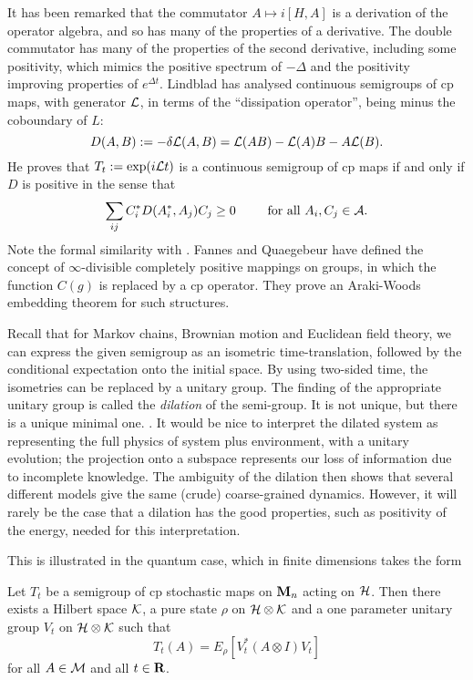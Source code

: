 It has been remarked that the commutator $A\mapsto i[H,A]$ is a derivation
of the operator algebra, and so has many of the properties of a derivative.
The double commutator
has many of the properties of the second derivative, including some
positivity, which mimics the positive spectrum of $-\Delta$ and the
positivity improving properties of $e^{\Delta t}$.
Lindblad has analysed continuous semigroups of cp maps, with generator ${\cal
L}$, in terms of the ``dissipation operator'', being minus the coboundary of
$L$:
\begin{equation}
D(A,B):=-\delta{\cal L}(A,B)={\cal L}(AB)-{\cal L}(A)B-A{\cal L}(B).
\end{equation}
He proves that $T_t:=\exp(i{\cal L}t)$ is a continuous semigroup of cp maps
if and only if $D$ is positive in the sense that
\begin{equation}
\sum_{ij}C_i^*D(A_i^*,A_j)C_j\geq0\hspace{.3in}\mbox{ for all }A_i, C_j\in
{\cal A}.
\end{equation}
Note the formal similarity with \cite{Araki,RFS2,RFS4,Partha}. Fannes and
Quaegebeur \cite{Fannes} have defined the concept of $\infty$-divisible
completely positive mappings on groups, in which the function $C(g)$ is
replaced by a cp operator. They prove an Araki-Woods embedding theorem
for such structures.


Recall that for Markov chains, Brownian motion and Euclidean field theory,
we can express the given semigroup as an isometric time-translation,
followed by the conditional expectation onto the initial space.
By using two-sided time, the isometries can be replaced by a unitary group.
The finding of the appropriate unitary group is called the {\em dilation}
of the semi-group. It is not unique, but there is a unique minimal one.
\cite{Stinespring}. It would be nice to interpret the dilated system
as representing the full physics of system plus environment, with a
unitary evolution; the projection onto a subspace represents our loss
of information due to incomplete knowledge. The ambiguity of the dilation
then shows that several different models give the same (crude)
coarse-grained dynamics. However, it will rarely be the case that a dilation
has the good properties, such as positivity of the energy, needed for
this interpretation.

This is illustrated in the quantum case, which in finite dimensions
takes the form \cite{Davies}
\begin{theorem}
Let $T_t$ be a semigroup of cp stochastic maps on ${\bf M}_n$ acting
on ${\cal H}$. Then there exists a Hilbert space ${\cal K}$, a pure state
$\rho$ on ${\cal H}\otimes{\cal K}$ and a one parameter unitary group
$V_t$ on ${\cal H}\otimes{\cal K}$ such that
\[ T_t(A)=E_\rho[V^*_t(A\otimes I)V_t]\]
for all $A\in{\cal M}$ and all $t\in{\bf R}$.
\end{theorem}

